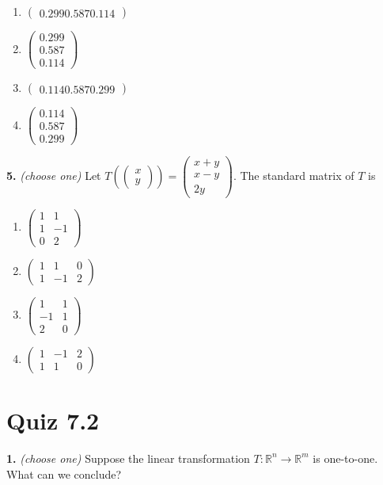\documentclass[10pt,a4paper]{article}
\begin{document}
\begin{enumerate}[label=(\Alph*)]
\item \(\begin{pmatrix}0.2990.5870.114\end{pmatrix}\)
\item \(\begin{pmatrix}0.299\\0.587\\0.114\end{pmatrix}\)
\item \(\begin{pmatrix}0.1140.5870.299\end{pmatrix}\)
\item \(\begin{pmatrix}0.114\\0.587\\0.299\end{pmatrix}\)
\end{enumerate}
\smallskip
\textbf{5.} \textit{(choose one)} Let \(T\left(\begin{pmatrix}x\\y\end{pmatrix}\right)=\begin{pmatrix}x+y\\x-y\\2y\end{pmatrix}\). The standard matrix of \(T\) is

\begin{enumerate}[label=(\Alph*)]
\item \(\begin{pmatrix}1&1\\1&-1\\0&2\end{pmatrix}\)
\item \(\begin{pmatrix}1&1&0\\1&-1&2\end{pmatrix}\)
\item \(\begin{pmatrix}1&1\\-1&1\\2&0\end{pmatrix}\)
\item \(\begin{pmatrix}1&-1&2\\1&1&0\end{pmatrix}\)
\end{enumerate}
\smallskip
\section{Quiz 7.2}
\textbf{1.} \textit{(choose one)} Suppose the linear transformation \(T:\mathbb{R}^n\to\mathbb{R}^m\) is one-to-one. What can we conclude?
\end{document}
